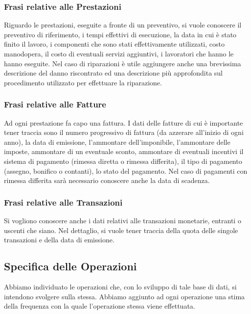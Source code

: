 		\subsubsection{Frasi relative alle Prestazioni}
		
			Riguardo le prestazioni, eseguite a fronte di un preventivo, si vuole conoscere il preventivo di riferimento, i tempi effettivi di esecuzione, la data in cui è stato finito il lavoro, i componenti che sono stati effettivamente utilizzati, costo manodopera, il costo di eventuali servizi aggiuntivi, i lavoratori che hanno le hanno eseguite.
			Nel caso di riparazioni è utile aggiungere anche una brevissima descrizione del danno riscontrato ed una descrizione più approfondita sul procedimento utilizzato per effettuare la riparazione.
			
		\subsubsection{Frasi relative alle Fatture}
		
			Ad ogni prestazione fa capo una fattura. I dati delle fatture di cui è importante tener traccia sono il numero progressivo di fattura (da azzerare all'inizio di ogni anno), la data di emissione, l'ammontare dell'imponibile, l'ammontare delle imposte, ammontare di un eventuale sconto, ammontare di eventuali incentivi il sistema di pagamento (rimessa diretta o rimessa differita), il tipo di pagamento (assegno, bonifico o contanti), lo stato del pagamento. Nel caso di pagamenti con rimessa differita sarà necessario conoscere anche la data di scadenza.
		
		\subsubsection{Frasi relative alle Transazioni}
		
			Si vogliono conoscere anche i dati relativi alle transazioni monetarie, entranti o uscenti che siano. Nel dettaglio, si vuole tener traccia della quota delle singole transazioni e della data di emissione.
			
	\subsection{Specifica delle Operazioni}
		
		Abbiamo individuato le operazioni che, con lo sviluppo di tale base di dati, si intendono svolgere sulla stessa. Abbiamo aggiunto ad ogni operazione una stima della frequenza con la quale l'operazione stessa viene effettuata.
		
